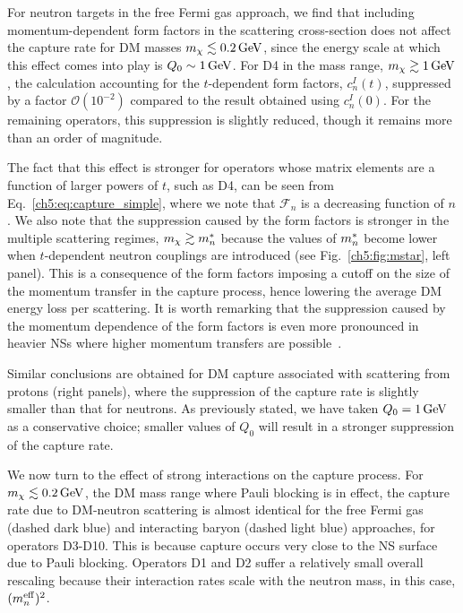 For neutron targets in the free Fermi gas approach, we find that including momentum-dependent form factors in the scattering cross-section does not affect the capture rate for DM masses $m_\chi\lesssim0.2{\rm \,GeV}$, since the energy scale at which this effect comes into play is $Q_0\sim1{\rm \,GeV}$. For D4 in the mass range, $m_\chi\gtrsim1{\rm \,GeV}$, the calculation accounting for the $t$-dependent form factors, $c_n^I(t)$, suppressed by a factor $\mathcal{O}(10^{-2})$ compared to the result obtained using $c_n^I(0)$.
For the remaining operators, this suppression is slightly reduced, though it remains more than an order of magnitude.

The fact that this effect is stronger for operators whose matrix elements are a function of larger powers of $t$, such as D4, can be seen from  Eq.~\ref{ch5:eq:capture_simple}, where we note that 
$\mathcal{F}_n$ is a decreasing function of $n$. 
We also note that the suppression caused by the form factors is stronger in the multiple scattering regimes, $m_\chi\gtrsim m_n^*$ because the values of $m_n^*$ become lower when $t$-dependent neutron couplings are introduced (see Fig.~\ref{ch5:fig:mstar}, left panel). This is a consequence of the form factors imposing a cutoff on the 
size of the momentum transfer in the capture process, hence lowering the average DM energy loss per scattering. 
It is worth remarking that the suppression caused by the momentum dependence of the form factors is even more pronounced in heavier NSs where higher momentum transfers are possible~\cite{Bell:2020obw_sep_NucleonStructureStrong}. 

Similar conclusions are obtained for DM capture associated with scattering from protons (right panels), where the suppression of the capture rate is slightly smaller than that for neutrons. 
As previously stated, we have taken $Q_0=1{\rm \,GeV}$ as a conservative choice; smaller values of $Q_0$ will result in a stronger suppression of the capture rate. 


We now turn to the effect of strong interactions on the capture process. For $m_\chi\lesssim 0.2{\rm \,GeV}$, the DM mass range where Pauli blocking is in effect, the capture rate due to DM-neutron scattering is almost identical for the free Fermi gas (dashed dark blue) and interacting baryon (dashed light blue) approaches, for operators D3-D10. This is because capture occurs very close to the NS surface due to Pauli blocking. Operators D1 and D2 suffer a relatively small overall rescaling because their interaction rates scale with the neutron mass, in this case, $(m_n^{\rm eff})^2$. 


